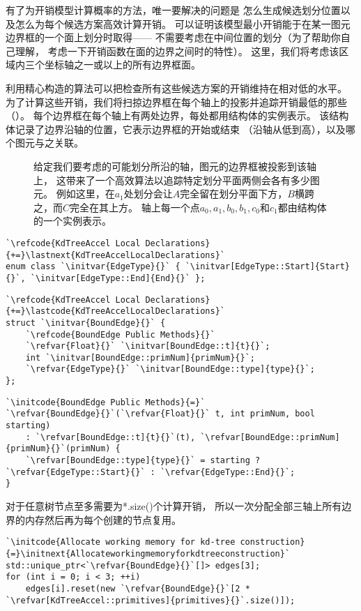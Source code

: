有了为开销模型计算概率的方法，唯一要解决的问题是
怎么生成候选划分位置以及怎么为每个候选方案高效计算开销。
可以证明该模型最小开销能于在某一图元边界框的一个面上划分时取得——
不需要考虑在中间位置的划分（为了帮助你自己理解，
考虑一下开销函数在面的边界之间时的特性）。
这里，我们将考虑该区域内三个坐标轴之一或以上的所有边界框面。

利用精心构造的算法可以把检查所有这些候选方案的开销维持在相对低的水平。
为了计算这些开销，我们将扫掠边界框在每个轴上的投影并追踪开销最低的那些（）。
每个边界框在每个轴上有两处边界，每处都用结构体的实例表示。
该结构体记录了边界沿轴的位置，它表示边界框的开始或结束
（沿轴从低到高），以及哪个图元与之关联。
\begin{figure}[htbp]
    \centering
    \caption{给定我们要考虑的可能划分所沿的轴，图元的边界框被投影到该轴上，
    这带来了一个高效算法以追踪特定划分平面两侧会各有多少图元。
    例如这里，在$a_1$处划分会让$A$完全留在划分平面下方，$B$横跨之，而$C$完全在其上方。
    轴上每一个点$a_0,a_1,b_0,b_1,c_0$和$c_1$都由结构体的一个实例表示。}
    \label{fig:4.15}
\end{figure}
\begin{lstlisting}
`\refcode{KdTreeAccel Local Declarations}{+=}\lastnext{KdTreeAccelLocalDeclarations}`
enum class `\initvar{EdgeType}{}` { `\initvar[EdgeType::Start]{Start}{}`, `\initvar[EdgeType::End]{End}{}` };
\end{lstlisting}
\begin{lstlisting}
`\refcode{KdTreeAccel Local Declarations}{+=}\lastcode{KdTreeAccelLocalDeclarations}`
struct `\initvar{BoundEdge}{}` {
    `\refcode{BoundEdge Public Methods}{}`
    `\refvar{Float}{}` `\initvar[BoundEdge::t]{t}{}`;
    int `\initvar[BoundEdge::primNum]{primNum}{}`;
    `\refvar{EdgeType}{}` `\initvar[BoundEdge::type]{type}{}`;
};
\end{lstlisting}
\begin{lstlisting}
`\initcode{BoundEdge Public Methods}{=}`
`\refvar{BoundEdge}{}`(`\refvar{Float}{}` t, int primNum, bool starting)
    : `\refvar[BoundEdge::t]{t}{}`(t), `\refvar[BoundEdge::primNum]{primNum}{}`(primNum) {
    `\refvar[BoundEdge::type]{type}{}` = starting ? `\refvar{EdgeType::Start}{}` : `\refvar{EdgeType::End}{}`;
}
\end{lstlisting}

对于任意树节点至多需要为{*.size()}个计算开销，
所以一次分配全部三轴上所有边界的内存然后再为每个创建的节点复用。
\begin{lstlisting}
`\initcode{Allocate working memory for kd-tree construction}{=}\initnext{Allocateworkingmemoryforkdtreeconstruction}`
std::unique_ptr<`\refvar{BoundEdge}{}`[]> edges[3];
for (int i = 0; i < 3; ++i)
    edges[i].reset(new `\refvar{BoundEdge}{}`[2 * `\refvar[KdTreeAccel::primitives]{primitives}{}`.size()]);
\end{lstlisting}


